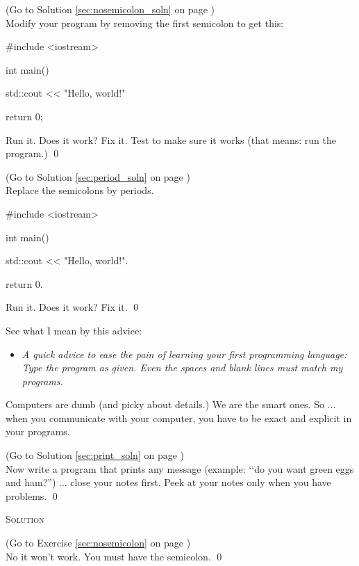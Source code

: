 \begin{console}[commandchars=\~\!\@]
\begin{ex}
\label{sec:nosemicolon}
(Go to Solution \ref{sec:nosemicolon_soln} 
on page \pageref{sec:nosemicolon_soln}) 
\\
Modify your program by removing the first semicolon to get this:
\begin{console}
#include <iostream>

int main()
{
    std::cout << "Hello, world!\n"

    return 0;
}
\end{console}
Run it. 
Does it work? 
Fix it. 
Test to make sure it works (that means: run the program.)
\qed
\end{ex}


\begin{ex}
\label{sec:period}
(Go to Solution \ref{sec:period_soln} 
on page \pageref{sec:period_soln}) 
\\
Replace the semicolons by periods.
\begin{console}
#include <iostream>

int main()
{
    std::cout << "Hello, world!\n".

    return 0.
}
\end{console}
Run it. Does it work? Fix it.
\qed
\end{ex}

See what I mean by this advice:

\begin{itemize}
\item[]
\textit{A quick advice to ease the pain of learning your first programming 
language: Type the program 
 as given. 
Even the spaces and blank lines must match my programs.}
\end{itemize}

Computers are dumb (and picky about details.) 
We are the smart ones. So ... when you communicate with your computer, 
you have to be exact and explicit in your programs.


\begin{ex} 
\label{sec:print}
(Go to Solution \ref{sec:print_soln} 
on page \pageref{sec:print_soln}) 
\\
Now write a program that prints any message 
(example: \lq\lq do you want green eggs and ham?'') ... 
close your notes first. Peek at your notes only when you have problems.
\qed
\end{ex}



\newpage\textsc{Solution}

\begin{soln}
\label{sec:nosemicolon_soln} 
(Go to Exercise \ref{sec:nosemicolon} 
on page \pageref{sec:nosemicolon})
\\
No it won't work. 
You must have the semicolon.
\qed
\end{soln}



\end{console}
